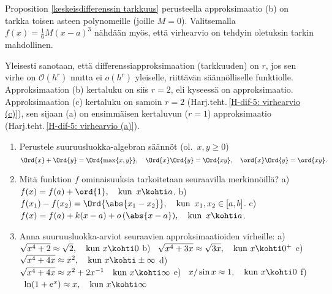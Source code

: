 Proposition \ref{keskeisdifferenssin tarkkuus} perusteella approksimaatio (b) on tarkka
toisen asteen polynomeille (joille $M=0$). Valitsemalla $f(x)=\frac{1}{6}M(x-a)^3$ nähdään
myös, että virhearvio on tehdyin oletuksin tarkin mahdollinen.

Yleisesti sanotaan, että differenssiapproksimaation (tarkkuuden)
%
 on $r$, jos
sen virhe on $\mathcal{O}(h^r)$ mutta ei $o(h^r)$ yleiselle, riittävän säännölliselle
funktiolle. Approksimaation (b) kertaluku on siis $r=2$, eli kyseessä on
 approksimaatio. Approksimaation (c) kertaluku on samoin $r=2$
(Harj.teht.\,\ref{H-dif-5: virhearvio (c)}), sen sijaan (a) on ensimmäisen kertaluvun ($r=1$)
approksimaatio (Harj.teht.\,\ref{H-dif-5: virhearvio (a)}).

\Harj
\begin{enumerate}

\item \label{H-VIII-5: suuruusluokka-algebra}
Perustele suuruusluokka-algebran säännöt (ol.\ $x,y \ge 0$)
\[
\Ord{x}+\Ord{y} = \Ord{\max\{x,y\}}, \quad 
\Ord{x}\Ord{y} = \Ord{xy}, \quad
\ord{x}\Ord{y} = \ord{xy}.
\]

\item
Mitä funktion $f$ ominaisuuksia tarkoitetaan seuraavilla merkinnöillä? \newline
a) \ $f(x)=f(a)+\ord{1}, \quad \text{kun}\,\ x \kohti a$. \newline
b) \ $f(x_1)-f(x_2)=\Ord{\abs{x_1-x_2}}, \quad \text{kun}\,\ x_1,x_2\in[a,b]$. \newline
c) \ $f(x)=f(a)+k(x-a)+o\,(\abs{x-a}), \quad \text{kun}\,\ x \kohti a$.

\item
Anna suuruusluokka-arviot seuraavien approksimaatioiden virheille: \vspace{1mm}\newline
a) \ $\sqrt{x^4+2} \approx \sqrt{2}, \quad \text{kun}\ x \kohti 0$ \vspace{2mm}\newline
b) \ $\sqrt{x^4+3x} \approx \sqrt{3x}, \quad \text{kun}\ x \kohti 0^+$ \vspace{1mm}\newline
c) \ $\sqrt{x^4+4x} \approx x^2, \quad \text{kun}\ x\kohti\pm\infty$ \vspace{1mm}\newline
d) \ $\sqrt{x^4+4x} \approx x^2+2x^{-1} \quad \text{kun}\ x\kohti\infty$ \vspace{0.5mm}\newline
e) \ $x/\sin x \approx 1, \quad \text{kun}\ x \kohti 0$ \vspace{1mm}\newline
f) \ $\ln(1+e^x) \approx x, \quad \text{kun}\ x\kohti\infty$


\end{enumerate}
